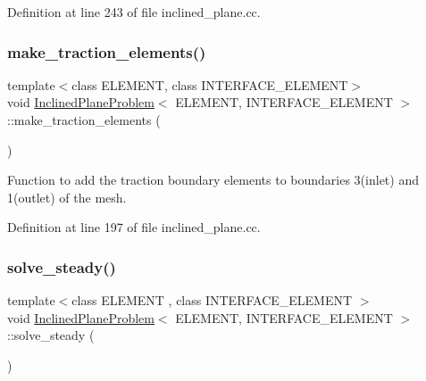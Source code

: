 Definition at line 243 of file inclined\+\_\+plane.\+cc.

\mbox{\label{classInclinedPlaneProblem_a39ab8005f7603bd1f06f13d6e7a3ae64}} 
\subsubsection{\texorpdfstring{make\+\_\+traction\+\_\+elements()}{make\_traction\_elements()}}
{\footnotesize\ttfamily template$<$class E\+L\+E\+M\+E\+NT, class I\+N\+T\+E\+R\+F\+A\+C\+E\+\_\+\+E\+L\+E\+M\+E\+NT$>$ \\
void \hyperlink{classInclinedPlaneProblem}{Inclined\+Plane\+Problem}$<$ E\+L\+E\+M\+E\+NT, I\+N\+T\+E\+R\+F\+A\+C\+E\+\_\+\+E\+L\+E\+M\+E\+NT $>$\+::make\+\_\+traction\+\_\+elements (\begin{DoxyParamCaption}{ }\end{DoxyParamCaption})\hspace{0.3cm}{\ttfamily [inline]}}



Function to add the traction boundary elements to boundaries 3(inlet) and 1(outlet) of the mesh. 



Definition at line 197 of file inclined\+\_\+plane.\+cc.

\mbox{\label{classInclinedPlaneProblem_a0e2fcfdb8230df82729ba7d728e58040}} 
\subsubsection{\texorpdfstring{solve\+\_\+steady()}{solve\_steady()}}
{\footnotesize\ttfamily template$<$class E\+L\+E\+M\+E\+NT , class I\+N\+T\+E\+R\+F\+A\+C\+E\+\_\+\+E\+L\+E\+M\+E\+NT $>$ \\
void \hyperlink{classInclinedPlaneProblem}{Inclined\+Plane\+Problem}$<$ E\+L\+E\+M\+E\+NT, I\+N\+T\+E\+R\+F\+A\+C\+E\+\_\+\+E\+L\+E\+M\+E\+NT $>$\+::solve\+\_\+steady (\begin{DoxyParamCaption}{ }\end{DoxyParamCaption})}



